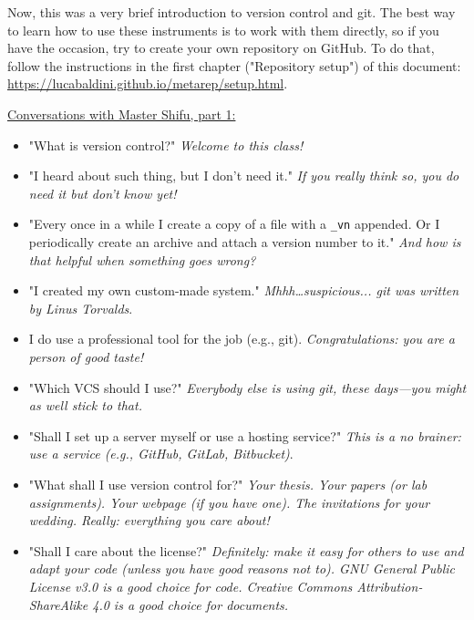 Now, this was a very brief introduction to version control and git. The best way to learn how to use these instruments is to work with them directly, so if you have the occasion, try to create your own repository on GitHub. To do that, follow the instructions in the first chapter ("Repository setup") of this document: \url{https://lucabaldini.github.io/metarep/setup.html}.

\hrulefill

{\footnotesize
\underline{Conversations with Master Shifu, part 1:}

\begin{itemize}
    \item[-] "What is version control?" \textit{Welcome to this class!}
    \item[-] "I heard about such thing, but I don't need it." \textit{If you really think so, you do need it but don't know yet!}
    \item[-] "Every once in a while I create a copy of a file with a \texttt{\_vn} appended. Or I periodically create an archive and attach a version number to it." \textit{And how is that helpful when something goes wrong?}
    \item[-] "I created my own custom-made system." \textit{Mhhh\ldots suspicious... git was written by Linus Torvalds}.
    \item[-] I do use a professional tool for the job (e.g., git). \textit{Congratulations: you are a person of good taste!}
    \item[-] "Which VCS should I use?" \textit{Everybody else is using git, these days---you might as well stick to that.}
    \item[-] "Shall I set up a server myself or use a hosting service?" \textit{This is a no brainer: use a service (e.g., GitHub, GitLab, Bitbucket)}.
    \item[-] "What shall I use version control for?" \textit{Your thesis. Your papers (or lab assignments). Your webpage (if you have one). The invitations for your wedding. Really: everything you care about!}
    \item[-] "Shall I care about the license?" \textit{Definitely: make it easy for others to use and adapt your code (unless you have good reasons not to). GNU General Public License v3.0 is a good choice for code. Creative Commons Attribution-ShareAlike 4.0 is a good choice for documents.}
\end{itemize} }

\hrulefill

